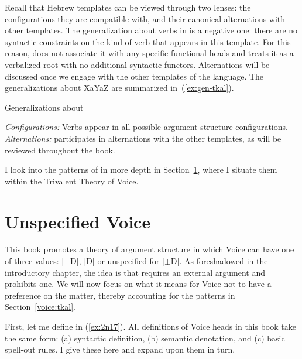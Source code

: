 \begin{exe}
\begin{xlist}
\begin{exe}
\begin{xlist}
\begin{exe}
\begin{xlist}
\begin{exe}
\begin{exe}
\begin{xlist}
\begin{exe}
\begin{xlist}
\begin{exe}
\begin{xlist}
\begin{exe}
\begin{xlist}
\begin{exe}
\begin{xlist}
\begin{exe}
\begin{xlist}
\begin{exe}
\begin{xlist}
\begin{exe}
\begin{xlist}
\begin{exe}
\begin{xlist}
\begin{exe}
\begin{xlist}
\begin{exe}
\begin{xlist}
Recall that Hebrew templates can be viewed through two lenses: the configurations they are compatible with, and their canonical alternations with other templates. The generalization about verbs in {\tkal} is a negative one: there are no syntactic constraints on the kind of verb that appears in this template. For this reason, \cite{doron03} does not associate it with any specific functional heads and \cite{borer13oup,borer15roots} treats it as a verbalized root with no additional syntactic functors. Alternations will be discussed once we engage with the other templates of the language. The generalizations about XaYaZ are summarized in~(\ref{ex:gen-tkal}).

 \begin{exe}
 \ex  \label{ex:gen-tkal}Generalizations about {\tkal}
 \begin{xlist} 
 	\ex  \textit{Configurations:} Verbs appear in all possible argument structure configurations. 
 	\ex  \textit{Alternations:} {\tkal} participates in alternations with the other templates, as will be reviewed throughout the book. 
 \z
\z 

I look into the patterns of {\tkal} in more depth in Section~\ref{voice:voice}, where I situate them within the Trivalent Theory of Voice.

\section{Unspecified Voice} \label{voice:voice}
This book promotes a theory of argument structure in which Voice can have one of three values: [+D], [\textminus{}D] or unspecified for [$\pm$D]. As foreshadowed in the introductory chapter, the idea is that {\vd} requires an external argument and {\vz} prohibits one. We will now focus on what it means for Voice not to have a preference on the matter, thereby accounting for the patterns in Section~\ref{voice:tkal}.

First, let me define  in (\ref{ex:2n17}). All definitions of Voice heads in this book take the same form: (a) syntactic definition, (b) semantic denotation, and (c) basic spell-out rules. I give these here and expand upon them in turn.


\end{xlist}
\end{exe}
\end{xlist}
\end{exe}
\end{xlist}
\end{exe}
\end{xlist}
\end{exe}
\end{xlist}
\end{exe}
\end{xlist}
\end{exe}
\end{xlist}
\end{exe}
\end{xlist}
\end{exe}
\end{xlist}
\end{exe}
\end{xlist}
\end{exe}
\end{xlist}
\end{exe}
\end{xlist}
\end{exe}
\end{exe}
\end{xlist}
\end{exe}
\end{xlist}
\end{exe}
\end{xlist}
\end{exe}
